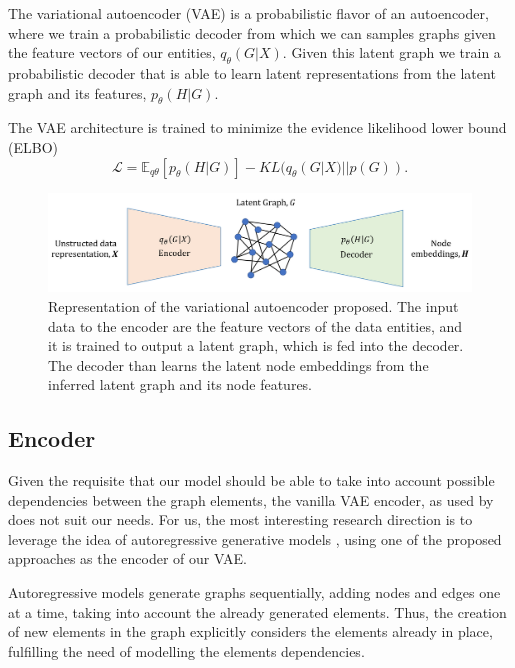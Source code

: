 \documentclass[12pt,a4paper]{article}
\begin{document}
	The variational autoencoder (VAE) is a probabilistic flavor of an autoencoder, where we train a probabilistic decoder from which we can samples graphs given the feature vectors of our entities, $q_\theta (G|X)$. Given this latent graph we train a probabilistic decoder that is able to learn latent representations from the latent graph and its features, $p_\theta (H|G)$.
	
	The VAE architecture is trained to minimize the evidence likelihood lower bound (ELBO)
	\begin{equation}
		\mathscr{L} = \mathbb{E}_{q\theta} [ p_\theta(H|G)] - KL(q_\theta (G|X)||p(G)) \text{.}\label{ELBO}
	\end{equation}

	\begin{figure}[hbtp]
		\includegraphics[width=\textwidth]{vae_figure.png}
		\caption{Representation of the variational autoencoder proposed. The input data to the encoder are the feature vectors of the data entities, and it is trained to output a latent graph, which is fed into the decoder. The decoder than learns the latent node embeddings from the inferred latent graph and its node features.\label{vae}}
	\end{figure}


	\subsection{Encoder}
	
	Given the requisite that our model should be able to take into account possible dependencies between the graph elements, the vanilla VAE encoder, as used by \textcite{KipfNRI2018} does not suit our needs. For us, the most interesting research direction is to leverage the idea of autoregressive generative models \citep{Li2018, You2018, Liao2019}, using one of the proposed approaches as the encoder of our VAE. 
	
	Autoregressive models generate graphs sequentially, adding nodes and edges one at a time, taking into account the already generated elements. Thus, the creation of new elements in the graph explicitly considers the elements already in place, fulfilling the need of modelling the elements dependencies.
	
\end{document}
